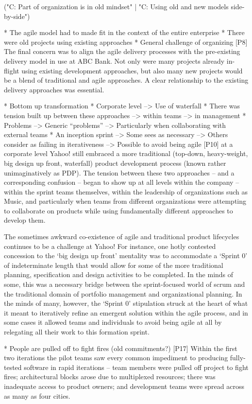 \documentclass[preprint,authoryear,12pt]{elsarticle}
\begin{document}
("C: Part of organization is in old mindset" | "C: Using old and new models side-by-side")


* The agile model had to made fit in the context of the entire enterprise
* There were old projects using existing approaches
* General challenge of organizing
[P8]
The final concern was to align the agile delivery processes with the
pre-existing delivery model in use at ABC Bank. Not only were many projects
already in-flight using existing development approaches, but also many new
projects would be a blend of traditional and agile approaches. A clear
relationship to the existing delivery approaches was essential.


* Bottom up transformation
* Corporate level --> Use of waterfall
* There was tension built up between these approaches --> within teams --> in management
* Problems --> Generic ``problems'' --> Particularly when collaborating with external teams
* An inception sprint --> Some sees as necessary --> Others consider as failing in iterativeness --> Possible to avoid being agile
[P10]
at a corporate level Yahoo! still embraced a more traditional (top-down,
heavy-weight, big design up front, waterfall) product development process (known
rather unimaginatively as PDP). The tension between these two approaches – and a
corresponding confusion – began to show up at all levels within the company –
within the sprint teams themselves, within the leadership of organizations such
as Music, and particularly when teams from different organizations were
attempting to collaborate on products while using  fundamentally different
approaches to develop them.

The sometimes awkward co-existence of agile and traditional product lifecycles
continues to be a challenge at Yahoo!  For instance, one hotly contested
concession to the ‘big design up front’ mentality was to accommodate a ‘Sprint
0’ of indeterminate length that would allow for some of the more traditional
planning, specification and design activities to be completed.  In the minds of
some, this was a necessary bridge between the sprint-focused world of scrum and
the traditional domain of portfolio management and organizational planning.  In
the minds of many, however, the ‘Sprint 0’ stipulation struck at the heart of
what it meant to iteratively refine an emergent solution within the agile
process, and  in some cases it allowed teams and individuals to avoid being
agile at all by relegating all their work to this formation sprint.


* People are pulled off to fight fires (old commitments?)
[P17]
Within the first two iterations the pilot teams saw every common impediment to
producing fully-tested software in rapid iterations – team members were pulled
off project to fight fires; architectural blocks arose due to multiplexed
resources; there was inadequate access to product owners; and development teams
were spread across as many as four cities.
\end{document}

